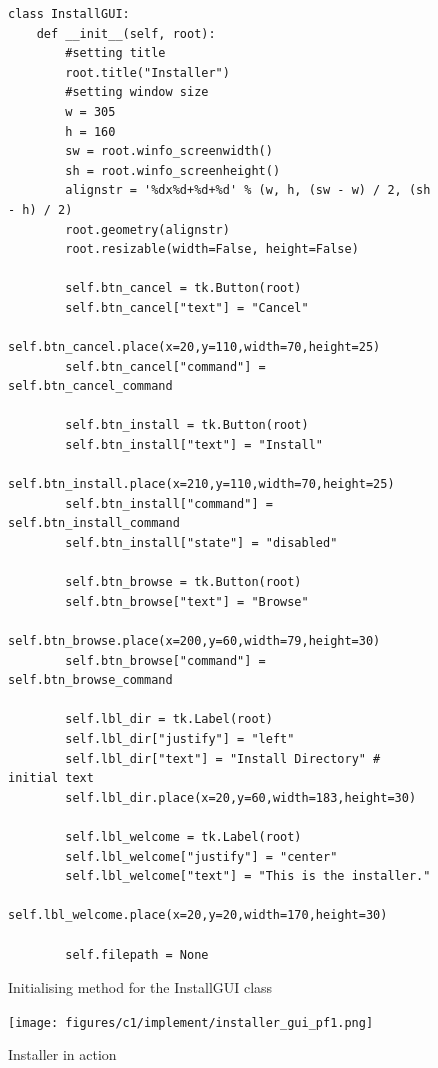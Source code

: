 \documentclass[11pt]{article}
\begin{document}
                \begin{figure}[!ht]
                    \begin{verbatim}
class InstallGUI:
    def __init__(self, root):
        #setting title
        root.title("Installer")
        #setting window size
        w = 305
        h = 160
        sw = root.winfo_screenwidth()
        sh = root.winfo_screenheight()
        alignstr = '%dx%d+%d+%d' % (w, h, (sw - w) / 2, (sh - h) / 2)
        root.geometry(alignstr)
        root.resizable(width=False, height=False)

        self.btn_cancel = tk.Button(root)
        self.btn_cancel["text"] = "Cancel"
        self.btn_cancel.place(x=20,y=110,width=70,height=25)
        self.btn_cancel["command"] = self.btn_cancel_command

        self.btn_install = tk.Button(root)
        self.btn_install["text"] = "Install"
        self.btn_install.place(x=210,y=110,width=70,height=25)
        self.btn_install["command"] = self.btn_install_command
        self.btn_install["state"] = "disabled"

        self.btn_browse = tk.Button(root)
        self.btn_browse["text"] = "Browse"
        self.btn_browse.place(x=200,y=60,width=79,height=30)
        self.btn_browse["command"] = self.btn_browse_command

        self.lbl_dir = tk.Label(root)
        self.lbl_dir["justify"] = "left"
        self.lbl_dir["text"] = "Install Directory" # initial text
        self.lbl_dir.place(x=20,y=60,width=183,height=30)

        self.lbl_welcome = tk.Label(root)
        self.lbl_welcome["justify"] = "center"
        self.lbl_welcome["text"] = "This is the installer."
        self.lbl_welcome.place(x=20,y=20,width=170,height=30)
        
        self.filepath = None
                    \end{verbatim}
                    \caption{Initialising method for the InstallGUI class}
                    \label{sc:install_gui_init_sc_c1}
                \end{figure}
                

                \begin{figure}[!ht]
                    \centering
                    \texttt{[image: figures/c1/implement/installer\_gui\_pf1.png]}
                    \caption{Installer in action}
                    \label{fig:installer_gui_ss1_c1}
                \end{figure}
\end{document}
